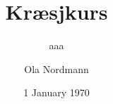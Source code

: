 \documentclass[screen, aspectratio=43]{beamer}
\title[Kræsjkurs]{Kræsjkurs}
\subtitle{aaa}
\author[O. Nordmann]{Ola Nordmann}
\institute[NTNU]{, NTNU}
\date{1 January 1970}
\begin{document}
\begin{frame} 
\titlepage
\end{frame} 








\end{document}
